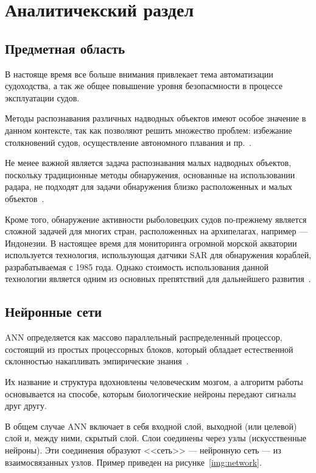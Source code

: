\chapter{Аналитичекский раздел}

\section{Предметная область}

В настояще время все больше внимания привлекает тема автоматизации судоходства, а так же общее повышение уровня безопасмности в процессе эксплуатации судов.

Методы распознавания различных надводных объектов имеют особое значение в данном контексте, так как позволяют решить множество проблем: избежание столкновений судов, осуществление автономного плавания и пр.~\cite{ship-detection}.

Не менее важной является задача распознавания малых надводных объектов, поскольку традиционные методы обнаружения, основанные на использовании радара, не подходят для задачи обнаружения близко расположенных и малых объектов~\cite{small-ship-detection}.

Кроме того, обнаружение активности рыболовецких судов по-прежнему является сложной задачей для многих стран, расположенных на архипелагах, например --- Индонезии. В настоящее время для мониторинга огромной морской акватории используется технология, использующая датчики SAR для обнаружения кораблей, разрабатываемая с 1985 года. Однако стоимость использования данной технологии является одним из основных препятствий для дальнейшего развития~\cite{boats-recognition}.

\section{Нейронные сети}

ANN определяется как массово параллельный распределенный процессор, состоящий из простых процессорных блоков, который обладает естественной склонностью накапливать эмпирические знания~\cite{ann}. 

Их название и структура вдохновлены человеческим мозгом, а алгоритм работы основывается на способе, которым биологические нейроны передают сигналы друг другу.

В общем случае ANN включает в себя входной слой, выходной (или целевой) слой и, между ними, скрытый слой. Слои соединены через узлы (искусственные нейроны). Эти соединения образуют <<сеть>> --- нейронную сеть --- из взаимосвязанных узлов. Пример приведен на рисунке~\ref{img:network}.


